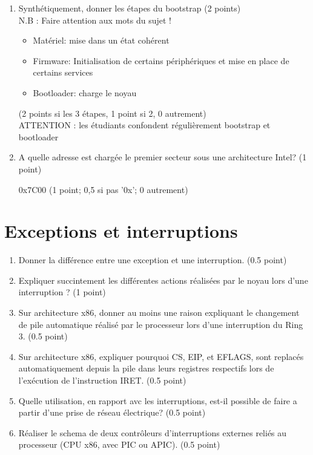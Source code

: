 \begin{enumerate}
\item Synthétiquement, donner les étapes du bootstrap (2 points)\\
N.B : Faire attention aux mots du sujet !

\begin{correction}
\begin{itemize}
  \item Matériel: mise dans un état cohérent
  \item Firmware: Initialisation de certains périphériques et mise en place de certains services
  \item Bootloader: charge le noyau
\end{itemize}
(2 points si les 3 étapes, 1 point si 2, 0 autrement)\\
ATTENTION : les étudiants confondent régulièrement bootstrap et bootloader\\
\end{correction}


\item A quelle adresse est chargée le premier secteur sous une architecture Intel? (1 point)

\begin{correction}
 0x7C00 (1 point; 0,5 si pas '0x'; 0 autrement)
\end{correction}

\end{enumerate}

\section{{Exceptions et interruptions}
         {\hfill{} }}
\begin{enumerate}
  \item Donner la différence entre une exception et une interruption. (0.5 point)
  \item Expliquer succintement les différentes actions réalisées par le noyau lors d'une interruption ? (1 point)
  \item Sur architecture x86, donner au moins une raison expliquant le changement de pile automatique réalisé par le processeur lors d'une interruption du Ring 3. (0.5 point)
  \item Sur architecture x86, expliquer pourquoi CS, EIP, et EFLAGS, sont replacés automatiquement depuis la pile dans leurs registres respectifs lors de l'exécution de l'instruction IRET. (0.5 point)
  \item Quelle utilisation, en rapport avc les interruptions, est-il possible de faire a partir d'une prise de réseau électrique? (0.5 point)
  \item Réaliser le schema de deux contrôleurs d'interruptions externes reliés au processeur (CPU x86, avec PIC ou APIC). (0.5 point)
\end{enumerate}

